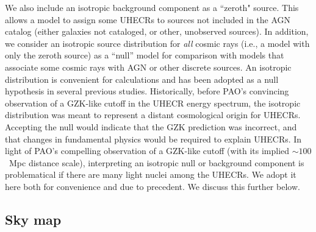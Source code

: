 We also include an isotropic background component as a ``zeroth" source.
This allows a model to assign some UHECRs to sources not included in the AGN
catalog (either galaxies not cataloged, or other, unobserved sources). In
addition, we consider an isotropic source distribution for {\em all} cosmic
rays (i.e., a model with only the zeroth source) as a ``null'' model for
comparison with models that associate some cosmic rays with AGN or other
discrete sources.  An isotropic distribution is convenient for calculations
and has been adopted as a null hypothesis in several previous studies. 
Historically, before PAO's convincing observation of a GZK-like cutoff in
the UHECR energy spectrum, the isotropic distribution was meant to represent
a distant cosmological origin for UHECRs.  Accepting the null would indicate
that the GZK prediction was incorrect, and that changes in fundamental
physics would be required to explain UHECRs.  In light of PAO's compelling
observation of a GZK-like cutoff (with its implied $\sim 100$~Mpc distance
scale), interpreting an isotropic null or background component is
problematical if there are many light nuclei among the UHECRs.  We adopt it
here both for convenience and due to precedent.  We discuss this further
below.

\subsection{Sky map}

